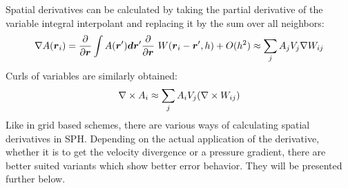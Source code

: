 Spatial derivatives can be calculated by taking the partial derivative of the variable integral interpolant  and replacing it by the sum over all neighbors:
\begin{equation}
\label{ch02_sph01_eq005}
\nabla A(\boldsymbol{r}_i) = \frac{\partial}{\partial \boldsymbol{r}}\int A(\boldsymbol{r}') \boldsymbol{d} \boldsymbol{r}' \frac{\partial}{\partial \boldsymbol{r}}\ W(\boldsymbol{r}_i - \boldsymbol{r}', h) + O(h^2)
\approx \sum_{j} A_j V_{j} \nabla W_{ij} 
\end{equation}
Curls of variables are similarly obtained:
\begin{equation}
\label{ch02_sph01_eq006}
\nabla \times A_i \approx \sum_{j} A_i V_{j} (\nabla \times W_{ij})
\end{equation}
Like in grid based schemes, there are various ways of calculating spatial derivatives in SPH.
Depending on the actual application of the derivative, whether it is to get the velocity divergence or a pressure gradient, there are better suited variants which show better error behavior. They will be presented further below.

